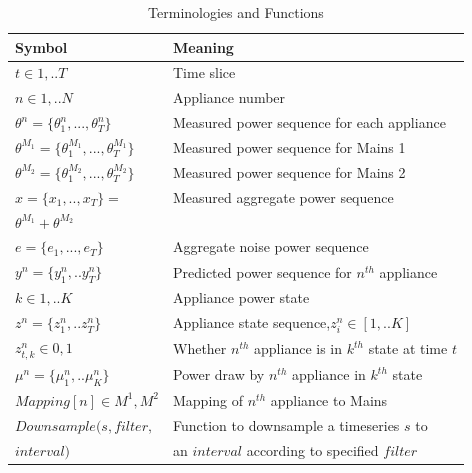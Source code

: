 \documentclass[conference]{IEEEtran}
\begin{document}
\begin{table}
\caption{Terminologies and Functions}
\label{tab:terms}
\begin{tabular}{|l|l|}
\hline
Symbol&Meaning\\
\hline
$t\in {1,..T}$& Time slice\\
$n\in{1,..N}$ & Appliance number\\
$\theta^n=\{\theta_1^n,...,\theta_T^n\}$ & Measured power sequence for each appliance\\
$\theta^{M_1}=\{\theta_1^{M_1},...,\theta_T^{M_1}\}$ & Measured power sequence for Mains 1\\
$\theta^{M_2}=\{\theta_1^{M_2},...,\theta_T^{M_2}\}$ & Measured power sequence for Mains 2\\
$x=\{ x_1,..,x_T\}=$ & Measured aggregate power sequence\\
$\theta^{M_1}+\theta^{M_2}$ &\\
$e=\{e_1,...,e_T\}$ & Aggregate noise power sequence\\
$y^n=\{y_1^n,..y_T^n\}$ & Predicted power sequence for $n^{th}$ appliance\\
$k\in {1,..K}$ & Appliance power state\\
$z^n=\{z_1^n,..z_T^n\}$ & Appliance state sequence,$z_i^n \in [1,..K]$\\
$z_{t,k}^n \in{0,1}$ & Whether $n^{th}$ appliance is in $k^{th}$ state at time $t$\\
$\mu^n=\{\mu_1^n,..\mu_K^n\}$ & Power draw by $n^{th}$ appliance in $k^{th}$ state\\
$Mapping[n] \in {M^1,M^2}$ & Mapping of $n^{th}$ appliance to Mains\\
\hline
\hline
$Downsample(s,filter,$ & Function to downsample a timeseries $s$ to\\
$interval)$                                        & an $interval$ according to specified $filter$\\

\end{tabular}
\end{table}
\end{document}
